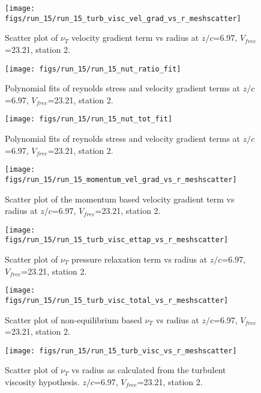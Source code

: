 \begin{figure}[H]
\centering
\texttt{[image: figs/run\_15/run\_15\_turb\_visc\_vel\_grad\_vs\_r\_meshscatter]}
\caption{Scatter plot of $\nu_T$ velocity gradient term vs radius at $z/c$=6.97, $V_{free}$=23.21, station 2.}
\end{figure}


\begin{figure}[H]
\centering
\texttt{[image: figs/run\_15/run\_15\_nut\_ratio\_fit]}
\caption{Polynomial fits of reynolds stress and velocity gradient terms at $z/c$=6.97, $V_{free}$=23.21, station 2.}
\end{figure}


\begin{figure}[H]
\centering
\texttt{[image: figs/run\_15/run\_15\_nut\_tot\_fit]}
\caption{Polynomial fits of reynolds stress and velocity gradient terms at $z/c$=6.97, $V_{free}$=23.21, station 2.}
\end{figure}


\begin{figure}[H]
\centering
\texttt{[image: figs/run\_15/run\_15\_momentum\_vel\_grad\_vs\_r\_meshscatter]}
\caption{Scatter plot of the momentum based velocity gradient term vs radius at $z/c$=6.97, $V_{free}$=23.21, station 2.}
\end{figure}


\begin{figure}[H]
\centering
\texttt{[image: figs/run\_15/run\_15\_turb\_visc\_ettap\_vs\_r\_meshscatter]}
\caption{Scatter plot of $\nu_T$ pressure relaxation term vs radius at $z/c$=6.97, $V_{free}$=23.21, station 2.}
\end{figure}


\begin{figure}[H]
\centering
\texttt{[image: figs/run\_15/run\_15\_turb\_visc\_total\_vs\_r\_meshscatter]}
\caption{Scatter plot of non-equilibrium based $\nu_T$ vs radius at $z/c$=6.97, $V_{free}$=23.21, station 2.}
\end{figure}


\begin{figure}[H]
\centering
\texttt{[image: figs/run\_15/run\_15\_turb\_visc\_vs\_r\_meshscatter]}
\caption{Scatter plot of $\nu_T$ vs radius as calculated from the turbulent viscosity hypothesis. $z/c$=6.97, $V_{free}$=23.21, station 2.}
\end{figure}


